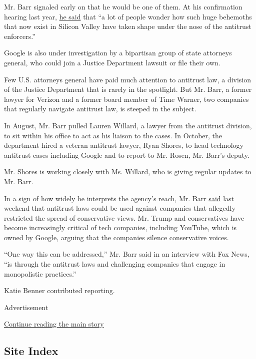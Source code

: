 Mr. Barr signaled early on that he would be one of them. At his
confirmation hearing last year,
\href{https://www.axios.com/bill-barr-confirmation-hearing-big-tech-antitrust-fe535feb-8980-4d47-94fa-15bb564e84de.html}{he
said} that ``a lot of people wonder how such huge behemoths that now
exist in Silicon Valley have taken shape under the nose of the antitrust
enforcers.''

Google is also under investigation by a bipartisan group of state
attorneys general, who could join a Justice Department lawsuit or file
their own.

Few U.S. attorneys general have paid much attention to antitrust law, a
division of the Justice Department that is rarely in the spotlight. But
Mr. Barr, a former lawyer for Verizon and a former board member of Time
Warner, two companies that regularly navigate antitrust law, is steeped
in the subject.

In August, Mr. Barr pulled Lauren Willard, a lawyer from the antitrust
division, to sit within his office to act as his liaison to the cases.
In October, the department hired a veteran antitrust lawyer, Ryan
Shores, to head technology antitrust cases including Google and to
report to Mr. Rosen, Mr. Barr's deputy.

Mr. Shores is working closely with Ms. Willard, who is giving regular
updates to Mr. Barr.

In a sign of how widely he interprets the agency's reach, Mr. Barr
\href{https://www.politico.com/morningtech/}{said} last weekend that
antitrust laws could be used against companies that allegedly restricted
the spread of conservative views. Mr. Trump and conservatives have
become increasingly critical of tech companies, including YouTube, which
is owned by Google, arguing that the companies silence conservative
voices.

``One way this can be addressed,'' Mr. Barr said in an interview with
Fox News, ``is through the antitrust laws and challenging companies that
engage in monopolistic practices.''

Katie Benner contributed reporting.

Advertisement

\protect\hyperlink{after-bottom}{Continue reading the main story}

\hypertarget{site-index}{%
\subsection{Site Index}\label{site-index}}

